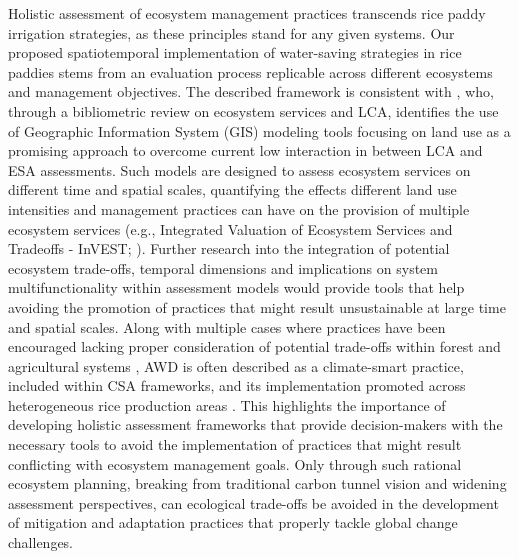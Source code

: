 Holistic assessment of ecosystem management practices transcends rice paddy irrigation strategies, as these principles stand for any given systems. Our proposed spatiotemporal implementation of water-saving strategies in rice paddies stems from an evaluation process replicable across different ecosystems and management objectives. The described framework is consistent with \cite{vanderwilde2021}, who, through a bibliometric review on ecosystem services and LCA, identifies the use of Geographic Information System (GIS) modeling tools focusing on land use as a promising approach to overcome current low interaction in between LCA and ESA assessments. Such models are designed to assess ecosystem services on different time and spatial scales, quantifying the effects different land use intensities and management practices can have on the provision of multiple ecosystem services (e.g., Integrated Valuation of Ecosystem Services and Tradeoffs - InVEST; \cite{stanford2011}). Further research into the integration of potential ecosystem trade-offs, temporal dimensions and implications on system multifunctionality within assessment models would provide tools that help avoiding the promotion of practices that might result unsustainable at large time and spatial scales. Along with multiple cases where practices have been encouraged lacking proper consideration of potential trade-offs within forest and agricultural systems \citep{veldman2015, felton2016, hof2018, cohen2021}, AWD is often described as a climate-smart practice, included within CSA frameworks, and its implementation promoted across heterogeneous rice production areas \citep{krishna2016climate, tivet2017climate, bwire2024, das2024}. This highlights the importance of developing holistic assessment frameworks that provide decision-makers with the necessary tools to avoid the implementation of practices that might result conflicting with ecosystem management goals. Only through such rational ecosystem planning, breaking from traditional carbon tunnel vision and widening assessment perspectives, can ecological trade-offs be avoided in the development of mitigation and adaptation practices that properly tackle global change challenges.\\ 



\renewcommand{\thefigure}{\thechapter.\arabic{figure}}
\setcounter{figure}{0}

\renewcommand{\thetable}{\thechapter.\arabic{table}}
\setcounter{table}{0}
